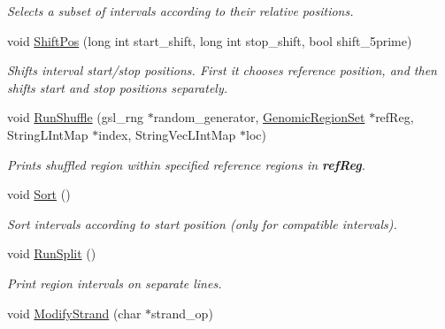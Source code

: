 \begin{CompactItemize}
\begin{CompactList}\small\item\em Selects a subset of intervals according to their relative positions. \item\end{CompactList}\item 
void \hyperlink{classGenomicRegionSAM_c6c559782775bfc65907801148226590}{ShiftPos} (long int start\_\-shift, long int stop\_\-shift, bool shift\_\-5prime)
\begin{CompactList}\small\item\em Shifts interval start/stop positions. First it chooses reference position, and then shifts start and stop positions separately. \item\end{CompactList}\item 
\hypertarget{classGenomicRegionSAM_b31fed1760d543fa3a38bb16a064dcf9}{
void \hyperlink{classGenomicRegionSAM_b31fed1760d543fa3a38bb16a064dcf9}{RunShuffle} (gsl\_\-rng $\ast$random\_\-generator, \hyperlink{classGenomicRegionSet}{GenomicRegionSet} $\ast$refReg, StringLIntMap $\ast$index, StringVecLIntMap $\ast$loc)}
\label{classGenomicRegionSAM_b31fed1760d543fa3a38bb16a064dcf9}

\begin{CompactList}\small\item\em Prints shuffled region within specified reference regions in {\bf refReg}. \item\end{CompactList}\item 
\hypertarget{classGenomicRegionSAM_8a27afdcdf11895d7b3f32bd8eed68ae}{
void \hyperlink{classGenomicRegionSAM_8a27afdcdf11895d7b3f32bd8eed68ae}{Sort} ()}
\label{classGenomicRegionSAM_8a27afdcdf11895d7b3f32bd8eed68ae}

\begin{CompactList}\small\item\em Sort intervals according to start position (only for compatible intervals). \item\end{CompactList}\item 
\hypertarget{classGenomicRegionSAM_e195a95ba837bfd9673093f1d451b39c}{
void \hyperlink{classGenomicRegionSAM_e195a95ba837bfd9673093f1d451b39c}{RunSplit} ()}
\label{classGenomicRegionSAM_e195a95ba837bfd9673093f1d451b39c}

\begin{CompactList}\small\item\em Print region intervals on separate lines. \item\end{CompactList}\item 
\hypertarget{classGenomicRegionSAM_beb76df49bb89ecf0f3074805d9fe7b2}{
void \hyperlink{classGenomicRegionSAM_beb76df49bb89ecf0f3074805d9fe7b2}{ModifyStrand} (char $\ast$strand\_\-op)}
\label{classGenomicRegionSAM_beb76df49bb89ecf0f3074805d9fe7b2}


\end{CompactItemize}
